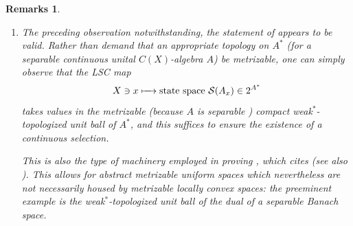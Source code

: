 \documentclass[11pt,leqno]{article}
\theoremstyle{plain}
\theoremstyle{plain}
\theoremstyle{plain}
\newtheorem{remarks}[lemma]{Remarks}
\numberwithin{equation}{section}
\theoremstyle{nonumberplain}
\newcommand\bR{{\mathbb R}}
\newcommand\cS{{\mathcal S}}
\newcommand\1{{\bf 1}}
\begin{document}
\begin{remarks}
\begin{enumerate}[(1),wide]
\begin{itemize}[wide]
    \item and hence no infinite-dimensional Banach space can be hemicompact \cite[\S 15.7(1)]{k_tvs-1}.
    \end{itemize}
    

  \item The preceding observation notwithstanding, the {\it statement} of \cite[Lemme 3.8]{blnch} appears to be valid. Rather than demand that an appropriate topology on $A^*$ (for a separable continuous unital $C(X)$-algebra $A$) be metrizable, one can simply observe that the LSC map
    \begin{equation*}
      X\ni x
      \xmapsto{\quad}
      \text{state space }\cS(A_x)
      \in 2^{A^*}
    \end{equation*}
    takes values in the metrizable (because $A$ is separable \cite[Theorem V.5.1]{conw_fa}) compact \cite[Theorem V.3.1]{conw_fa} weak$^*$-topologized unit ball of $A^*$, and this suffices \cite[Theorem 1.2]{zbMATH03285029} to ensure the existence of a continuous selection. 

    This is also the type of machinery employed in proving \cite[Theorem 2.12]{2409.03531v1}, which cites \cite[Theorem 3.4]{horv_top-cvx} (see also \cite[Theorem 5]{zbMATH00590976}). This allows for abstract metrizable uniform spaces which nevertheless are not necessarily housed by {\it metrizable} locally convex spaces: the preeminent example is the weak$^*$-topologized unit ball of the dual of a separable Banach space.
        

\end{enumerate}
\end{remarks}
\end{document}
